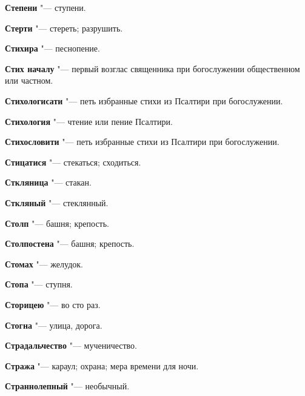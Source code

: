 \begin{mymulticols}{2}
\noindent\textbf{Степени} "--- ступени. 




\noindent\textbf{Стерти} "--- стереть; разрушить. 




\noindent\textbf{Стихира} "--- песнопение. 




\noindent\textbf{Стих началу} "--- первый возглас священника при богослужении общественном или частном. 




\noindent\textbf{Стихологисати} "--- петь избранные стихи из Псалтири при богослужении. 




\noindent\textbf{Стихология} "--- чтение или пение Псалтири. 




\noindent\textbf{Стихословити} "--- петь избранные стихи из Псалтири при богослужении. 




\noindent\textbf{Стицатися} "--- стекаться; сходиться. 




\noindent\textbf{Сткляница} "--- стакан. 




\noindent\textbf{Сткляный} "--- стеклянный. 




\noindent\textbf{Столп} "--- башня; крепость. 




\noindent\textbf{Столпостена} "--- башня; крепость. 




\noindent\textbf{Стомах} "--- желудок. 




\noindent\textbf{Стопа} "--- ступня. 




\noindent\textbf{Сторицею} "--- во сто раз. 




\noindent\textbf{Стогна} "--- улица, дорога. 




\noindent\textbf{Страдальчество} "--- мученичество. 




\noindent\textbf{Стража} "--- караул; охрана; мера времени для ночи. 




\noindent\textbf{Страннолепный} "--- необычный. 





\end{mymulticols}

